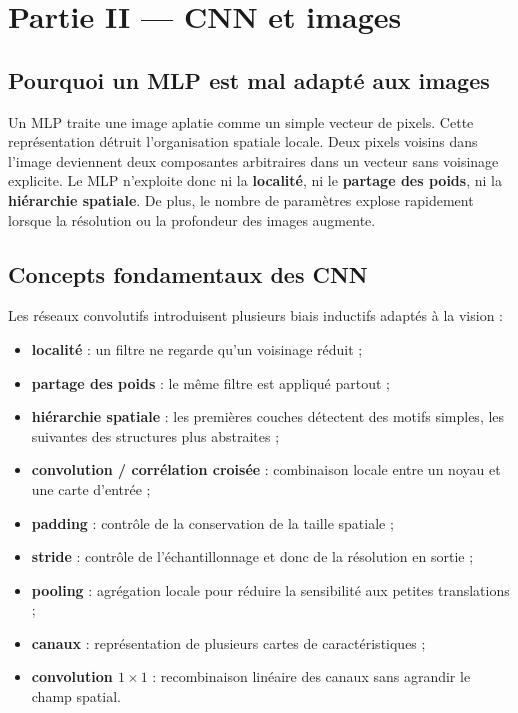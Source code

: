 \chapter{Partie II --- CNN et images}

\section{Pourquoi un MLP est mal adapté aux images}
Un MLP traite une image aplatie comme un simple vecteur de pixels. Cette représentation détruit l’organisation spatiale locale. Deux pixels voisins dans l’image deviennent deux composantes arbitraires dans un vecteur sans voisinage explicite. Le MLP n’exploite donc ni la \textbf{localité}, ni le \textbf{partage des poids}, ni la \textbf{hiérarchie spatiale}. De plus, le nombre de paramètres explose rapidement lorsque la résolution ou la profondeur des images augmente.

\section{Concepts fondamentaux des CNN}
Les réseaux convolutifs introduisent plusieurs biais inductifs adaptés à la vision :
\begin{itemize}[leftmargin=1.2cm]
    \item \textbf{localité} : un filtre ne regarde qu’un voisinage réduit ;
    \item \textbf{partage des poids} : le même filtre est appliqué partout ;
    \item \textbf{hiérarchie spatiale} : les premières couches détectent des motifs simples, les suivantes des structures plus abstraites ;
    \item \textbf{convolution / corrélation croisée} : combinaison locale entre un noyau et une carte d’entrée ;
    \item \textbf{padding} : contrôle de la conservation de la taille spatiale ;
    \item \textbf{stride} : contrôle de l’échantillonnage et donc de la résolution en sortie ;
    \item \textbf{pooling} : agrégation locale pour réduire la sensibilité aux petites translations ;
    \item \textbf{canaux} : représentation de plusieurs cartes de caractéristiques ;
    \item \textbf{convolution $1 \times 1$} : recombinaison linéaire des canaux sans agrandir le champ spatial.
\end{itemize}

